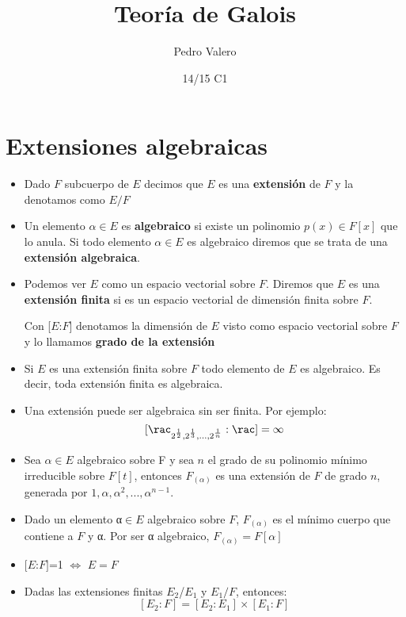 \documentclass[nochap]{apuntes}
\title{Teoría de Galois}
\author{Pedro Valero}
\date{14/15 C1}
\begin{document}
\pagestyle{plain}
\maketitle

\tableofcontents
\newpage

\section{Extensiones algebraicas}
\begin{itemize}
\item Dado $F$ subcuerpo de $E$ decimos que $E$ es una \textbf{extensión} de $F$ y la denotamos como $E/F$

\item Un elemento $α\in E$ es \textbf{algebraico} si existe un polinomio $p(x) \in F[x]$ que lo anula. Si todo elemento $α \in E$ es algebraico diremos que se trata de una \textbf{extensión algebraica}.

\item Podemos ver $E$ como un espacio vectorial sobre $F$. Diremos que $E$ es una \textbf{extensión finita} si es un espacio vectorial de dimensión finita sobre $F$. 

Con [$E$:$F$] denotamos la dimensión de $E$ visto como espacio vectorial sobre $F$ y lo llamamos \textbf{grado de la extensión}

\item Si $E$ es una extensión finita sobre $F$ todo elemento de $E$ es algebraico. Es decir, toda extensión finita es algebraica.

\item Una extensión puede ser algebraica sin ser finita. Por ejemplo: 
\[[\rac_{2^{\frac{1}{2}}, 2^{\frac{1}{3}}, ..., 2^{\frac{1}{n}}}:\rac] = \infty\]

\item Sea $α\in E$ algebraico sobre F y sea $n$ el grado de su polinomio mínimo irreducible sobre $F[t]$, entonces $F_{(α)}$ es una extensión de $F$ de grado $n$, generada por $1, α, α^2, ..., α^{n-1}$.

\item Dado un elemento α$\in E$ algebraico sobre $F$, $F_{(α)}$ es el mínimo cuerpo que contiene a $F$ y α. Por ser α algebraico, $F_{(α)}=F[α]$

\item $[E$:$F]$=1 $\iff$ $E=F$

\item Dadas las extensiones finitas $E_2$/$E_1$ y $E_1/F$, entonces:
\[[E_2:F]=[E_2:E_1]\times [E_1:F]\]


\end{itemize}
\end{document}
